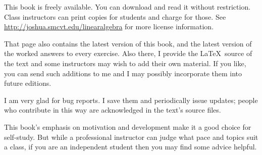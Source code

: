 \medskip
{}
This book is freely available.
You can download and read it without restriction.
Class instructors can print copies for
students and charge for those.
See 
\url{http://joshua.smcvt.edu/linearalgebra}
for more license information.

That page also contains the latest version of this book, and the
latest version of the worked answers to every exercise.
Also there, I provide the \LaTeX\ source of the text and some instructors
may wish to add their own material.
If you like, you can send such additions to me and I may possibly incorporate
them into future editions.

I am very glad for bug reports.
I save them and periodically issue updates; people who
contribute in this way are acknowledged in the text's source files.



\medskip
{}
%
\newcommand{\classday}[1]{\textsc{#1}}
\newcommand{\colwidth}{1.35in}
This book's emphasis on motivation and development make it
a good choice for self-study.
But while a professional instructor can judge what pace and topics suit a
class, if you are an independent student 
then you may find some advice helpful.

